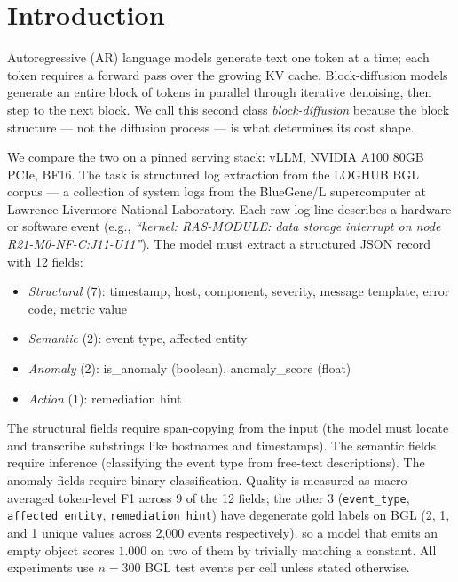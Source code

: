 \section{Introduction}
\label{sec:intro}

Autoregressive (AR) language models generate text one token at a time;
each token requires a forward pass over the growing KV cache.
Block-diffusion models generate an entire block of tokens in parallel
through iterative denoising, then step to the next block. We call this
second class \emph{block-diffusion} because the block structure --- not
the diffusion process --- is what determines its cost shape.

We compare the two on a pinned serving stack: vLLM, NVIDIA A100 80GB
PCIe, BF16. The task is structured log extraction from the LOGHUB BGL
corpus --- a collection of system logs from the BlueGene/L
supercomputer at Lawrence Livermore National Laboratory. Each raw log
line describes a hardware or software event (e.g., \textit{``kernel:
RAS-MODULE: data storage interrupt on node R21-M0-NF-C:J11-U11''}).
The model must extract a structured JSON record with 12 fields:

\begin{itemize}[nosep]
\item \emph{Structural} (7): timestamp, host, component,
  severity, message template, error code, metric value
\item \emph{Semantic} (2): event type, affected entity
\item \emph{Anomaly} (2): is\_anomaly (boolean),
  anomaly\_score (float)
\item \emph{Action} (1): remediation hint
\end{itemize}

The structural fields require span-copying from the input (the model
must locate and transcribe substrings like hostnames and timestamps).
The semantic fields require inference (classifying the event type from
free-text descriptions). The anomaly fields require binary
classification. Quality is measured as macro-averaged token-level F1
across 9 of the 12 fields; the other 3 (\texttt{event\_type},
\texttt{affected\_entity}, \texttt{remediation\_hint}) have degenerate
gold labels on BGL (2, 1, and 1 unique values across 2,000 events
respectively), so a model that emits an empty object scores $1.000$ on
two of them by trivially matching a constant. All experiments use
$n = 300$ BGL test events per cell unless stated otherwise.

